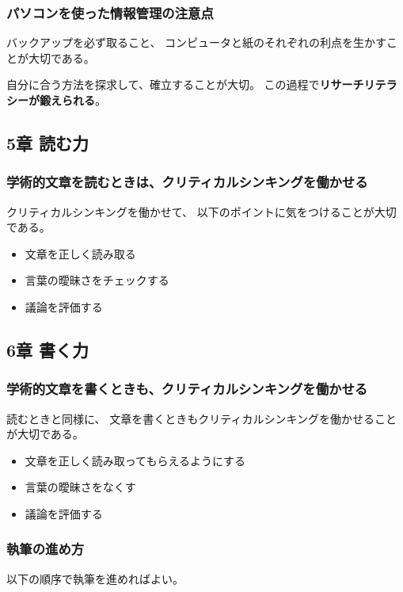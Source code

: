 \documentclass[]{jsarticle}
\begin{document}
        \subsubsection*{パソコンを使った情報管理の注意点}
            バックアップを必ず取ること、
            コンピュータと紙のそれぞれの利点を生かすことが大切である。

        自分に合う方法を探求して、確立することが大切。
        この過程で{\bf リサーチリテラシーが鍛えられる}。

    \subsection{5章 読む力}
        \subsubsection*{学術的文章を読むときは、クリティカルシンキングを働かせる}
            クリティカルシンキングを働かせて、
            以下のポイントに気をつけることが大切である。

            \begin{itemize}
                \item 文章を正しく読み取る
                \item 言葉の曖昧さをチェックする
                \item 議論を評価する
            \end{itemize}

    \subsection{6章 書く力}
        \subsubsection*{学術的文章を書くときも、クリティカルシンキングを働かせる}
            読むときと同様に、
            文章を書くときもクリティカルシンキングを働かせることが大切である。

            \begin{itemize}
                \item 文章を正しく読み取ってもらえるようにする
                \item 言葉の曖昧さをなくす
                \item 議論を評価する
            \end{itemize}

        \subsubsection*{執筆の進め方}
            以下の順序で執筆を進めればよい。
\end{document}
